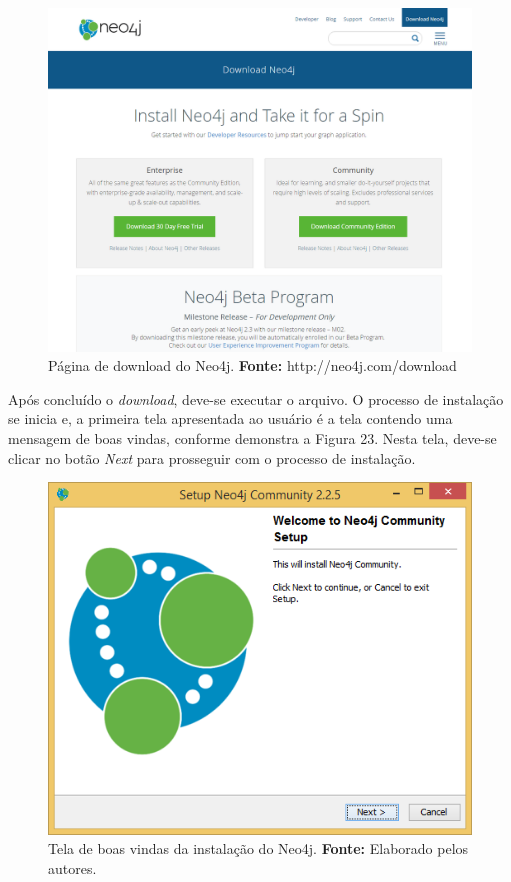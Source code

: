 \newpage
\begin{figure}[h!]
	\centerline{\includegraphics[scale=0.4]{./imagens/download-neo4j.png}}
	\caption[Página de download do Neo4j]
	{Página de download do Neo4j. \textbf{Fonte:} http://neo4j.com/download}
	\label{fig:exemplo1}
\end{figure}

\par Após concluído o \textit{download}, deve-se executar o arquivo. O processo de instalação se inicia e, a primeira tela apresentada ao usuário é a tela contendo uma mensagem de boas vindas, conforme demonstra a Figura 23. Nesta tela, deve-se clicar no botão \textit{Next} para prosseguir com o processo de instalação.

\begin{figure}[h!]
	\centerline{\includegraphics[scale=0.4]{./imagens/neo4j-install-step1.png}}
	\caption[Tela de boas vindas da instalação do Neo4j]
	{Tela de boas vindas da instalação do Neo4j. \textbf{Fonte:} Elaborado pelos autores.}
	\label{fig:exemplo1}
\end{figure}

